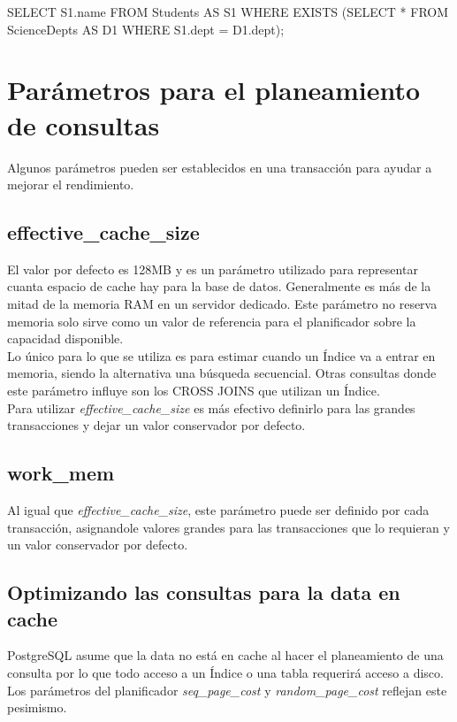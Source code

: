 \begin{pyglist}
SELECT S1.name
  FROM Students AS S1
 WHERE EXISTS
      (SELECT *
         FROM ScienceDepts AS D1
        WHERE S1.dept = D1.dept);
\end{pyglist}


\section{Parámetros para el planeamiento de consultas}

Algunos parámetros pueden ser establecidos en una transacción para ayudar a mejorar el rendimiento.

\subsection{effective\_cache\_size}

El valor por defecto es 128MB y es un parámetro utilizado para representar cuanta espacio de cache hay para la base de datos. Generalmente es más de la mitad de la memoria RAM en un servidor dedicado. Este parámetro no reserva memoria solo sirve como un valor de referencia para el planificador sobre la capacidad disponible.\\

Lo único para lo que se utiliza es para estimar cuando un Índice va a entrar en memoria, siendo la alternativa una búsqueda secuencial. Otras consultas donde este parámetro influye son los CROSS JOINS que utilizan un Índice.\\

Para utilizar \textit{effective\_cache\_size} es más efectivo definirlo para las grandes transacciones y dejar un valor conservador por defecto.

\subsection{work\_mem}

Al igual que \textit{effective\_cache\_size}, este parámetro puede ser definido por cada transacción, asignandole valores grandes para las transacciones que lo requieran y un valor conservador por defecto.

\subsection{Optimizando las consultas para la data en cache}

PostgreSQL asume que la data no está en cache al hacer el planeamiento de una consulta por lo que todo acceso a un Índice o una tabla requerirá acceso a disco. Los parámetros del planificador \textit{seq\_page\_cost} y \textit{random\_page\_cost} reflejan este pesimismo. \\

